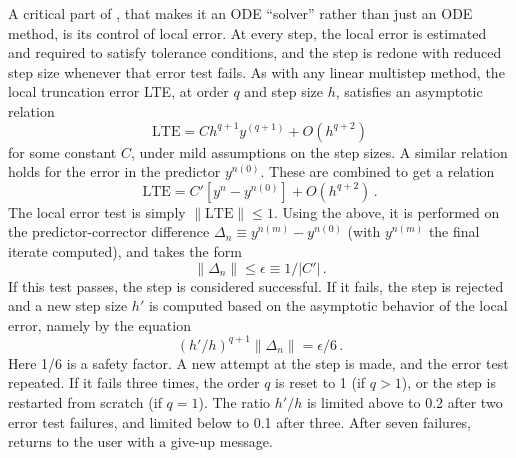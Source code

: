 A critical part of {\cvodes}, that makes it an ODE ``solver'' rather than
just an ODE method, is its control of local error.  At every step, the
local error is estimated and required to satisfy tolerance conditions,
and the step is redone with reduced step size whenever that error test
fails.  As with any linear multistep method, the local truncation
error LTE, at order $q$ and step size $h$, satisfies an asymptotic
relation
\[ \mbox{LTE} = C h^{q+1} y^{(q+1)} + O(h^{q+2}) \]
for some constant $C$, under mild assumptions on the step sizes.
A similar relation holds for the error in the predictor $y^{n(0)}$.
These are combined to get a relation
\[ \mbox{LTE} = C' [y^n - y^{n(0)}] + O(h^{q+2}) \, . \]
The local error test is simply $\|\mbox{LTE}\| \leq 1$.  Using the above,
it is performed on the predictor-corrector difference 
$\Delta_n \equiv y^{n(m)} - y^{n(0)}$ (with $y^{n(m)}$ the final
iterate computed), and takes the form
\[ \|\Delta_n\| \leq \epsilon \equiv 1/|C'| \, . \]
If this test passes, the step is considered successful.  If it fails,
the step is rejected and a new step size $h'$ is computed based on the
asymptotic behavior of the local error, namely by the equation
\[ (h'/h)^{q+1} \|\Delta_n\| = \epsilon/6 \, . \]
Here 1/6 is a safety factor.  A new attempt at the step is made,
and the error test repeated.  If it fails three times, the order $q$
is reset to 1 (if $q > 1$), or the step is restarted from scratch (if
$q = 1$).  The ratio $h'/h$ is limited above to 0.2 after two error test
failures, and limited below to 0.1 after three.  After seven failures,
{\cvodes} returns to the user with a give-up message.

